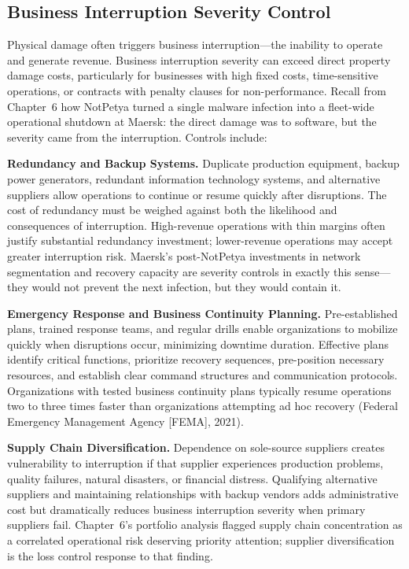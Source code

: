 \documentclass[11pt,openany]{book}
\begin{document}
\subsection{Business Interruption Severity Control}

Physical damage often triggers business interruption---the inability to
operate and generate revenue. Business interruption severity can exceed direct
property damage costs, particularly for businesses with high fixed costs,
time-sensitive operations, or contracts with penalty clauses for
non-performance. Recall from Chapter~6 how NotPetya turned a single malware
infection into a fleet-wide operational shutdown at Maersk: the direct damage
was to software, but the severity came from the interruption. Controls
include:

\textbf{Redundancy and Backup Systems.} Duplicate production equipment, backup
power generators, redundant information technology systems, and alternative
suppliers allow operations to continue or resume quickly after disruptions.
The cost of redundancy must be weighed against both the likelihood and
consequences of interruption. High-revenue operations with thin margins often
justify substantial redundancy investment; lower-revenue operations may accept
greater interruption risk. Maersk's post-NotPetya investments in network
segmentation and recovery capacity are severity controls in exactly this
sense---they would not prevent the next infection, but they would contain it.

\textbf{Emergency Response and Business Continuity Planning.} Pre-established
plans, trained response teams, and regular drills enable organizations to
mobilize quickly when disruptions occur, minimizing downtime duration.
Effective plans identify critical functions, prioritize recovery sequences,
pre-position necessary resources, and establish clear command structures and
communication protocols. Organizations with tested business continuity plans
typically resume operations two to three times faster than organizations
attempting ad hoc recovery (Federal Emergency Management Agency [FEMA], 2021).

\textbf{Supply Chain Diversification.} Dependence on sole-source suppliers
creates vulnerability to interruption if that supplier experiences production
problems, quality failures, natural disasters, or financial distress.
Qualifying alternative suppliers and maintaining relationships with backup
vendors adds administrative cost but dramatically reduces business
interruption severity when primary suppliers fail. Chapter~6's portfolio
analysis flagged supply chain concentration as a correlated operational risk
deserving priority attention; supplier diversification is the loss control
response to that finding.
\end{document}
